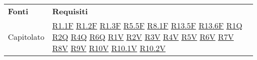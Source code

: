 
\begin{center}
    \centering
    \renewcommand{\arraystretch}{1.8}
    \label{tab:FontiRequisiti}
    \begin{longtable}[!h]{m{50px} m{50px}}
        \rowcolor{logo!70} \textbf{Fonti} & \textbf{Requisiti}                         \\
        Capitolato                        & \hyperref[tab:RequisitiFunzionali]{R1.1F}
        \newline \hyperref[tab:RequisitiFunzionali]{R1.2F}
        \newline \hyperref[tab:RequisitiFunzionali]{R1.3F}
        \newline \hyperref[tab:RequisitiFunzionali]{R5.5F}
        \newline \hyperref[tab:RequisitiFunzionali]{R8.1F}
        \newline \hyperref[tab:RequisitiFunzionali]{R13.5F}
        \newline \hyperref[tab:RequisitiFunzionali]{R13.6F}
        \newline \hyperref[tab:RequisitiQualita]{R1Q}
        \newline \hyperref[tab:RequisitiQualita]{R2Q}
        \newline \hyperref[tab:RequisitiQualita]{R4Q}
        \newline \hyperref[tab:RequisitiQualita]{R6Q}
        \newline \hyperref[tab:RequisitiVincolo]{R1V}
        \newline \hyperref[tab:RequisitiVincolo]{R2V}
        \newline \hyperref[tab:RequisitiVincolo]{R3V}
        \newline \hyperref[tab:RequisitiVincolo]{R4V}
        \newline \hyperref[tab:RequisitiVincolo]{R5V}
        \newline \hyperref[tab:RequisitiVincolo]{R6V}
        \newline \hyperref[tab:RequisitiVincolo]{R7V}
        \newline \hyperref[tab:RequisitiVincolo]{R8V}
        \newline \hyperref[tab:RequisitiVincolo]{R9V}
        \newline \hyperref[tab:RequisitiVincolo]{R10V}
        \newline \hyperref[tab:RequisitiVincolo]{R10.1V}
        \newline \hyperref[tab:RequisitiVincolo]{R10.2V}

\end{longtable}
\end{center}
